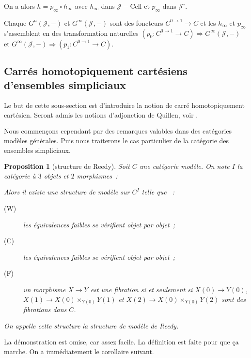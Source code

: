 \documentclass{amsart}
\theoremstyle{plain}
\newtheorem{prop}[theo]{Proposition}
\theoremstyle{definition}
\theoremstyle{remark}
\newcommand{\ra}{\rightarrow}
\begin{document}
On a alors $h=p_\infty\circ h_\infty$ avec $h_\infty$ dans $\mathcal{J}-\mathrm{Cell}$ et $p_\infty$ dans $\mathcal{J}^\square$.

Chaque $G^n(\mathcal{J},-)$ et $G^\infty(\mathcal{J},-)$ sont des foncteurs $C^{0\ra 1}\ra C$ et les $h_\infty$ et $p_\infty$
s'assemblent en des transformation naturelles $(p_0:C^{0\ra 1}\ra C)\Rightarrow G^\infty(\mathcal{J},-)$ et
$G^\infty(\mathcal{J},-)\Rightarrow (p_1:C^{0\ra 1}\ra C)$.


\subsection{Carrés homotopiquement cartésiens d'ensembles simpliciaux}
\label{carrehomotopiquementcart}

Le but de cette sous-section est d'introduire la notion de carré homotopiquement cartésien.
Seront admis les notions d'adjonction de Quillen, voir \cite[1.6]{Idri}.

Nous commençons cependant par des remarques valables dans des catégories modèles générales.
Puis nous traiterons le cas particulier de la catégorie des ensembles simpliciaux.

\begin{prop}[structure de Reedy]
  Soit $C$ une catégorie modèle. On note $I$ la catégorie à $3$ objets et $2$ morphismes~:
  \begin{center}
  \end{center}
  Alors il existe une structure de modèle sur $C^I$ telle que ~:
  \begin{description}
    \item[(W)] les équivalences faibles se vérifient objet par objet~;
    \item[(C)] les équivalences faibles se vérifient objet par objet~;
    \item[(F)] un morphisme $X\ra Y$ est une fibration si et seulement si $X(0)\ra Y(0)$, $X(1)\ra X(0)\times_{Y(0)} Y(1)$
    et $X(2)\ra X(0)\times_{Y(0)} Y(2)$ sont des fibrations dans $C$.
  \end{description}
  On appelle cette structure la structure de modèle de Reedy.
\end{prop}

La démonstration est omise, car assez facile. La définition est faite pour que ça marche. On a immédiatement le corollaire suivant.
\end{document}
